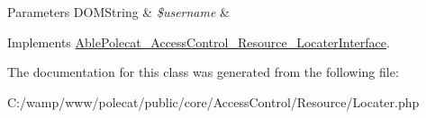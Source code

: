 \begin{DoxyParams}[1]{Parameters}
D\+O\+M\+String & {\em \$username} & \\
\hline
\end{DoxyParams}


Implements \hyperlink{interface_able_polecat___access_control___resource___locater_interface_ac359b701a2ccaff746dd480f03314244}{Able\+Polecat\+\_\+\+Access\+Control\+\_\+\+Resource\+\_\+\+Locater\+Interface}.



The documentation for this class was generated from the following file\+:\begin{DoxyCompactItemize}
\item 
C\+:/wamp/www/polecat/public/core/\+Access\+Control/\+Resource/Locater.\+php\end{DoxyCompactItemize}
